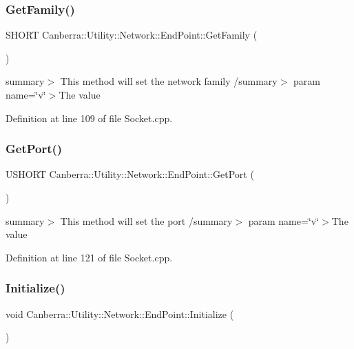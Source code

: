 \subsubsection{\texorpdfstring{Get\+Family()}{GetFamily()}}
{\footnotesize\ttfamily S\+H\+O\+RT Canberra\+::\+Utility\+::\+Network\+::\+End\+Point\+::\+Get\+Family (\begin{DoxyParamCaption}{ }\end{DoxyParamCaption})}

summary$>$ This method will set the network family /summary$>$ param name=\char`\"{}v\char`\"{}$>$The value

Definition at line 109 of file Socket.\+cpp.

\mbox{\label{class_canberra_1_1_utility_1_1_network_1_1_end_point_a5494dfb63773cb639455534cdbdabd54_a5494dfb63773cb639455534cdbdabd54}} 
\subsubsection{\texorpdfstring{Get\+Port()}{GetPort()}}
{\footnotesize\ttfamily U\+S\+H\+O\+RT Canberra\+::\+Utility\+::\+Network\+::\+End\+Point\+::\+Get\+Port (\begin{DoxyParamCaption}{ }\end{DoxyParamCaption})}

summary$>$ This method will set the port /summary$>$ param name=\char`\"{}v\char`\"{}$>$The value

Definition at line 121 of file Socket.\+cpp.

\mbox{\label{class_canberra_1_1_utility_1_1_network_1_1_end_point_a45b17740a2dcf339c2695f5aeca748be_a45b17740a2dcf339c2695f5aeca748be}} 
\subsubsection{\texorpdfstring{Initialize()}{Initialize()}}
{\footnotesize\ttfamily void Canberra\+::\+Utility\+::\+Network\+::\+End\+Point\+::\+Initialize (\begin{DoxyParamCaption}{ }\end{DoxyParamCaption})}



